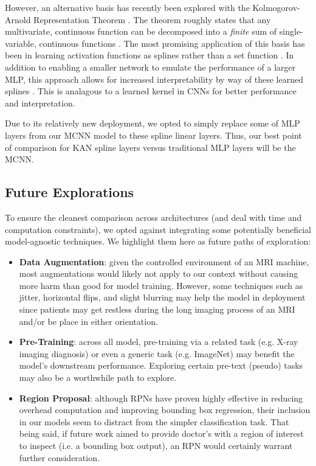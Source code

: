 \documentclass[conference]{IEEEtran}
\begin{document}
However, an alternative basis has recently been explored with the Kolmogorov-Arnold Representation Theorem \cite{kan}. The theorem roughly states that any multivariate, continuous function can be decomposed into a \textit{finite} sum of single-variable, continuous functions \cite{kan_approx_thm}. The most promising application of this basis has been in learning activation functions as splines rather than a set function \cite{kan}. In addition to enabling a smaller network to emulate the performance of a larger MLP, this approach allows for increased interpretability by way of these learned splines \cite{kan}. This is analagous to a learned kernel in CNNs for better performance and interpretation.

Due to its relatively new deployment, we opted to simply replace some of MLP layers from our MCNN model to these spline linear layers. Thus, our best point of comparison for KAN spline layers versus traditional MLP layers will be the MCNN.


\subsection{Future Explorations}
To ensure the cleanest comparison across architectures (and deal with time and computation constraints), we opted against integrating some potentially beneficial model-agnostic techniques. We highlight them here as future paths of exploration:
\begin{itemize}
    \item \textbf{Data Augmentation}: given the controlled environment of an MRI machine, most augmentations would likely not apply to our context without causing more harm than good for model training. However, some techniques such as jitter, horizontal flips, and slight blurring may help the model in deployment since patients may get restless during the long imaging process of an MRI and/or be place in either orientation.

    \item \textbf{Pre-Training}: across all model, pre-training via a related task (e.g. X-ray imaging diagnosis) or even a generic task (e.g. ImageNet) may benefit the model's downstream performance. Exploring certain pre-text (pseudo) tasks may also be a worthwhile path to explore.

    \item \textbf{Region Proposal}: although RPNs have proven highly effective in reducing overhead computation and improving bounding box regression, their inclusion in our models seem to distract from the simpler classification task. That being said, if future work aimed to provide doctor's with a region of interest to inspect (i.e. a bounding box output), an RPN would certainly warrant further consideration.
\end{itemize}
\end{document}
